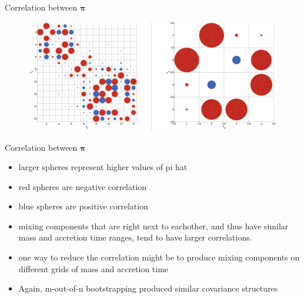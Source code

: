 \documentclass{beamer}
\newcommand{\vect}[1]{\boldsymbol{\mathbf{#1}}}
\newcommand{\vp}{\vect{\pi}}
\begin{document}
\begin{frame}{Correlation between $\vp$}	
	
	\begin{figure}
			\begin{center}
				\includegraphics[scale=0.17]{correl.pdf}
			\end{center}
	\end{figure}	
	
\end{frame}
\begin{frame}[shrink]{Correlation between $\vp$}
	
	\begin{itemize}
		\item larger spheres represent higher values of pi hat
		\item red spheres are negative correlation
		\item blue spheres are positive correlation
		\item mixing components that are right next to eachother, and thus have similar mass and accretion time ranges, tend to have larger correlations.
		\item one way to reduce the correlation might be to produce mixing components on different grids of mass and accretion time
		
		\item Again, m-out-of-n bootstrapping produced similar covariance structures
		
	\end{itemize}
	
\end{frame}
\end{document}
